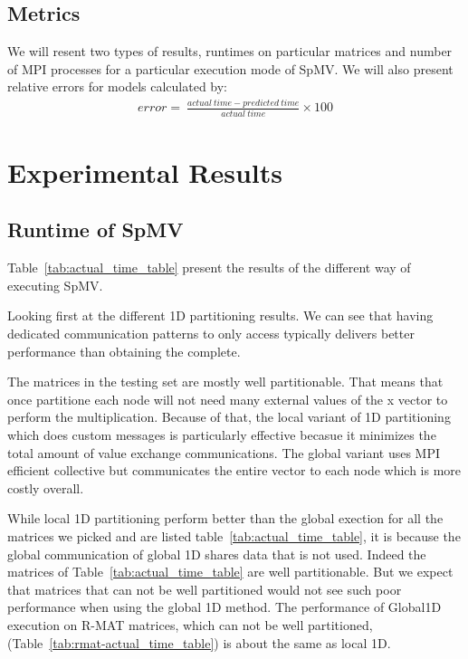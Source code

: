 \documentclass[sigconf,review,anonymous]{acmart}
\begin{document}
\subsection{Metrics}

We will resent two types of results, runtimes on particular matrices
and number of MPI processes for a particular execution mode of
SpMV. We will also present relative errors for models calculated by:
\begin{eqnarray*}
error =\ \frac{actual\ time - predicted\ time}{actual\ time}\times 100
\end{eqnarray*}


\section{Experimental Results}
\label{sec:results}

\subsection{Runtime of SpMV}

Table~\ref{tab:actual_time_table} present the results of the different way of executing SpMV.

Looking first at the different 1D partitioning results. We can see
that having dedicated communication patterns to only access typically
delivers better performance than obtaining the complete.

The matrices in the testing set are mostly well partitionable. That
means that once partitione each node will not need many external
values of the x vector to perform the multiplication. Because of that,
the local variant of 1D partitioning which does custom messages is
particularly effective becasue it minimizes the total amount of value
exchange communications. The global variant uses MPI efficient
collective but communicates the entire vector to each node which is
more costly overall.

While local 1D partitioning perform better than the global exection
for all the matrices we picked and are listed
table~\ref{tab:actual_time_table}, it is because the global
communication of global 1D shares data that is not used. Indeed the
matrices of Table~\ref{tab:actual_time_table} are well
partitionable. But we expect that matrices that can not be well
partitioned would not see such poor performance when using the global
1D method. The performance of Global1D execution on R-MAT matrices,
which can not be well partitioned,
(Table~\ref{tab:rmat-actual_time_table}) is about the same as local
1D.
\end{document}
